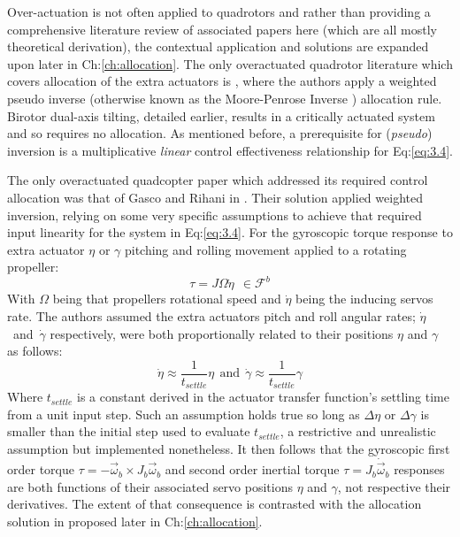 \par
Over-actuation is not often applied to quadrotors and rather than providing a comprehensive literature review of associated papers here (which are all mostly theoretical derivation), the contextual application and solutions are expanded upon later in Ch:\ref{ch:allocation}. The only overactuated quadrotor literature which covers allocation of the extra actuators is \cite{tiltgasco,tiltrihani}, where the authors apply a weighted pseudo inverse (otherwise known as the Moore-Penrose Inverse \cite{moorepenrose}) allocation rule. Birotor dual-axis tilting, detailed earlier, results in a critically actuated system and so requires no allocation. As mentioned before, a prerequisite for (\emph{pseudo}) inversion is a multiplicative \emph{linear} control effectiveness relationship for Eq:\ref{eq:3.4}. 
\par
The only overactuated quadcopter paper which addressed its required control allocation was that of Gasco and Rihani in \cite{tiltgasco,tiltrihani}. Their solution applied weighted inversion, relying on some very specific assumptions to achieve that required input linearity for the system in Eq:\ref{eq:3.4}. For the gyroscopic torque response to extra actuator $\eta$ or $\gamma$ pitching and rolling movement applied to a rotating propeller:
\begin{equation}
\tau=J\Omega\dot{\eta}~~\in\mathcal{F}^b
\end{equation}
With $\Omega$ being that propellers rotational speed and $\dot{\eta}$ being the inducing servos rate. The authors assumed the extra actuators pitch and roll angular rates; $\dot{\eta}$~and~$\dot{\gamma}$ respectively, were both proportionally related to their positions $\eta$ and $\gamma$ as follows:
\begin{equation}
\dot{\eta}\approx \frac{1}{t_{settle}}\eta~~\text{and}~~\dot{\gamma}\approx \frac{1}{t_{settle}}\gamma
\end{equation}
Where $t_{settle}$ is a constant derived in the actuator transfer function's settling time from a unit input step. Such an assumption holds true so long as $\Delta\eta$ or $\Delta\gamma$ is smaller than the initial step used to evaluate $t_{settle}$, a restrictive and unrealistic assumption but implemented nonetheless. It then follows that the gyroscopic first order torque $\tau=-\vec{\omega}_b\times J_b\vec{\omega}_b$ and second order inertial torque $\tau=J_b\dot{\vec{\omega}}_b$ responses are both functions of their associated servo positions $\eta$ and $\gamma$, not respective their derivatives. The extent of that consequence is contrasted with the allocation solution in proposed later in Ch:\ref{ch:allocation}.
